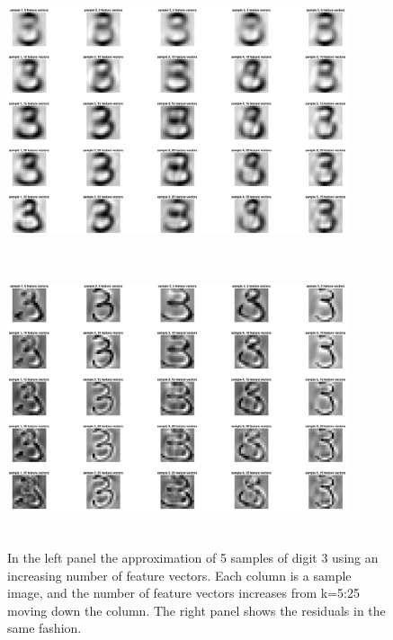 \documentclass{article}
\begin{document}
    \begin{figure}[!h]
        \centerline
        {
        \includegraphics[width=10cm, height=8cm] {Q_2_3_approx}\includegraphics[width=10cm, height=8cm]{Q_2_3_residual}
        }
        \caption{\label{fig:my figure}  In the left panel the approximation of 5 samples of digit 3 using an increasing number of feature vectors.  Each column is a sample image, and the number of feature vectors increases from k=5:25 moving down the column.  The right panel shows the residuals in the same fashion.}
    \end{figure}
    
\end{document}
